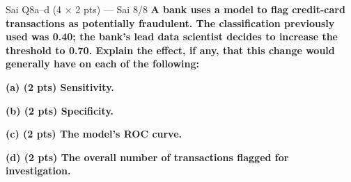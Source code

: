 \begin{qbox}{Sai Q8a--d (4 $\times$ 2 pts) --- Sai 8/8}
\textbf{A bank uses a model to flag credit-card transactions as potentially fraudulent. The classification  previously used was 0.40; the bank's lead data scientist decides to increase the threshold to 0.70. Explain the effect, if any, that this change would generally have on each of the following:}
\par\textbf{(a) (2 pts) Sensitivity.}
\par\textbf{(b) (2 pts) Specificity.}
\par\textbf{(c) (2 pts) The model's ROC curve.}
\par\textbf{(d) (2 pts) The overall number of transactions flagged for investigation.}


\end{qbox}
